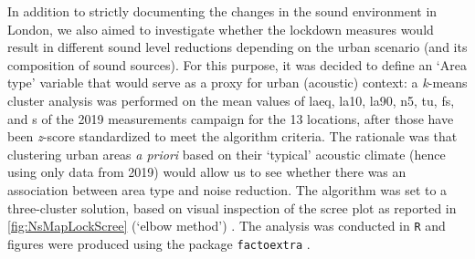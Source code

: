 In addition to strictly documenting the changes in the sound environment in London, we also aimed to investigate whether the lockdown measures would result in different sound level reductions depending on the urban scenario (and its composition of sound sources). For this purpose, it was decided to define an `Area type' variable that would serve as a proxy for urban (acoustic) context: a \emph{k}-means cluster analysis was performed on the mean values of \gls{laeq}, \gls{la10}, \gls{la90}, \gls{n5}, \gls{tu}, \gls{fs}, and \gls{s} of the 2019 measurements campaign for the 13 locations, after those have been \emph{z}-score standardized to meet the algorithm criteria. The rationale was that clustering urban areas \emph{a priori} based on their `typical' acoustic climate (hence using only data from 2019) would allow us to see whether there was an association between area type and noise reduction. The algorithm was set to a three-cluster solution, based on visual inspection of the scree plot as reported in \cref{fig:NsMapLockScree} (`elbow method') \citep{KetchenJr.1996application}. The analysis was conducted in \texttt{R} \citep{RCT2018R} and figures were produced using the package \texttt{factoextra} \citep{Kassambara2020factoextra}.

